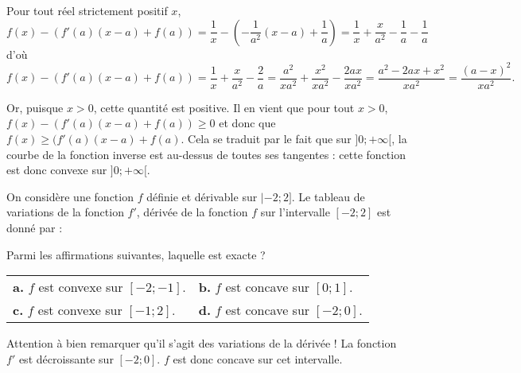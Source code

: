 \documentclass[11pt,fleqn, openany]{book} %
\begin{document}
\begin{solution}
Pour tout réel strictement positif \(x\),
\[f(x)-(f'(a)(x-a)+f(a))  = \dfrac{1}{x} - \left( -\dfrac{1}{a^2}(x-a)+\dfrac{1}{a}\right) = \dfrac{1}{x}+ \dfrac{x}{a^2} - \dfrac{1}{a} -\dfrac{1}{a}\]
d'où 
\[f(x)-(f'(a)(x-a)+f(a)) = \dfrac{1}{x} + \dfrac{x}{a^2}-\dfrac{2}{a} =\dfrac{a^2}{xa^2}+\dfrac{x^2}{xa^2} - \dfrac{2ax}{xa^2} = \dfrac{a^2-2ax+x^2}{xa^2}= \dfrac{(a-x)^2}{xa^2} .\]

Or, puisque \(x > 0\), cette quantité est positive. Il en vient que pour tout \(x>0\), \(f(x)-(f'(a)(x-a)+f(a)) \geqslant 0\) et donc que \(f(x)\geqslant (f'(a)(x-a)+f(a) \). Cela se traduit par le fait que sur \(]0;+\infty[\), la courbe de la fonction inverse est au-dessus de toutes ses tangentes : cette fonction est donc convexe sur \(]0;+\infty[\).\end{solution}

\begin{exercise}[topic=cvx02, subtitle={(Polynésie 2022)}]

On considère une fonction $f$ définie et dérivable sur $|-2;2]$. Le tableau de variations de la fonction $f'$, dérivée de la fonction $f$ sur l'intervalle $[-2;2]$ est donné par :
\begin{center}
\end{center}

Parmi les affirmations suivantes, laquelle est exacte ?

\begin{tabularx}{\linewidth}{XX}
\textbf{a.} $f$ est convexe sur $[-2;-1]$. & \textbf{b.} $f$ est concave sur $[0;1]$. \\
\textbf{c.} $f$ est convexe sur $[-1;2]$. & \textbf{d.} $f$ est concave sur $[-2;0]$.
\end{tabularx}\end{exercise}

\begin{solution}Attention à bien remarquer qu'il s'agit des variations de la dérivée ! La fonction $f'$ est décroissante sur $[-2;0]$. $f$ est donc concave sur cet intervalle.\end{solution}
\end{document}
